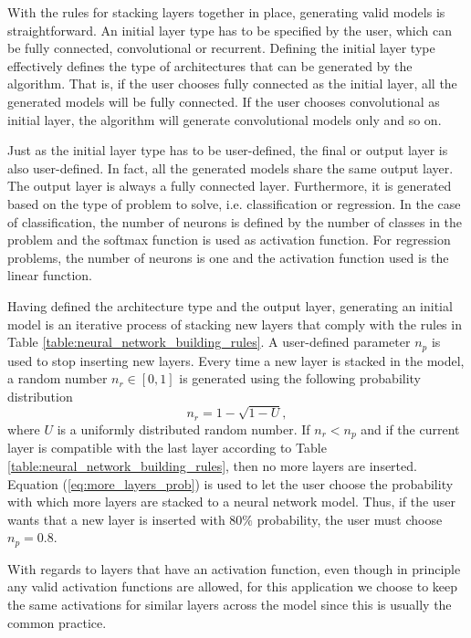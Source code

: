 \documentclass[12pt]{elsart}%
\begin{document}
With the rules for stacking layers together in place, generating valid models is straightforward. An initial layer type has to be specified by the user, which can be fully connected, convolutional or recurrent. Defining the initial layer type effectively defines the type of architectures that can be generated by the algorithm. That is, if the user chooses fully connected as the initial layer, all the generated models will be fully connected. If the user chooses convolutional as initial layer, the algorithm will generate convolutional models only and so on.

Just as the initial layer type has to be user-defined, the final or output layer is also user-defined. In fact, all  the generated models share the same output layer. The output layer is always a fully connected layer. Furthermore, it is generated based on the type of problem to solve, i.e. classification or regression. In the case of classification, the number of neurons is defined by the number of classes in the problem and the softmax function is used as activation function. For regression problems, the number of neurons is one and the activation function used is the linear function.

Having defined the architecture type and the output layer, generating an initial model is an iterative process of stacking new layers that comply with the rules in Table \ref{table:neural_network_building_rules}. A user-defined parameter $n_p$ is used to stop inserting new layers. Every time a new layer is stacked in the model, a random number $n_r \in \left[0,1\right]$ is generated using the following probability distribution
\begin{equation}
n_r = 1 - \sqrt{1 - U},
\label{eq:more_layers_prob}
\end{equation}
where $U$ is a uniformly distributed random number. If $n_r < n_p$ and if the current layer is compatible with the last layer according to Table \ref{table:neural_network_building_rules}, then no more layers are inserted. Equation (\ref{eq:more_layers_prob}) is used to let the user choose the probability with which more layers are stacked to a neural network model. Thus, if the user wants that a new layer is inserted with $80\%$ probability, the user must choose $n_p = 0.8$. 

With regards to layers that have an activation function, even though in principle any valid activation functions are allowed, for this application we choose to keep the same activations for similar layers across the model since this is usually the common practice. 
\end{document}
